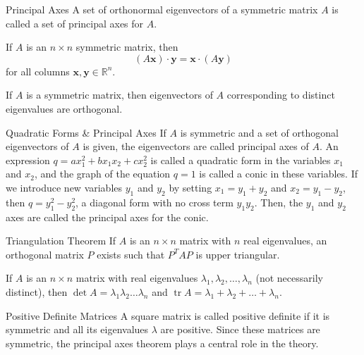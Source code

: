 \documentclass[12pt]{article}
\begin{document}
\begin{definition}{Principal Axes}{}
    A set of orthonormal eigenvectors of a symmetric matrix $ A $ is called a set of principal axes for $ A $.
\end{definition}

\begin{theorem}{}{}
    If $ A $ is an $ n \times n $ symmetric matrix, then
    \[ \left( A \mathbf{x} \right) \cdot \mathbf{y} = \mathbf{x} \cdot \left( A \mathbf{y} \right) \]
    for all columns $ \mathbf{x}, \mathbf{y} \in \mathbb{R}^n $.
\end{theorem}

\begin{theorem}{}{}
    If $ A $ is a symmetric matrix, then eigenvectors of $ A $ corresponding to distinct eigenvalues are orthogonal.
\end{theorem}

\begin{definition}{Quadratic Forms \& Principal Axes}{}
    If $ A $ is symmetric and a set of orthogonal eigenvectors of $ A $ is given, the eigenvectors are called principal axes of $ A $. An expression $ q = a x_1^2 + b x_1 x_2 + c x_2^2 $ is called a quadratic form in the variables $ x_1 $ and $ x_2 $, and the graph of the equation $ q = 1 $ is called a conic in these variables.
    \medskip
    \newline
    If we introduce new variables $ y_1 $ and $ y_2 $ by setting $ x_1 = y_1 + y_2 $ and $ x_2 = y_1 - y_2 $, then $ q = y_1^2 - y_2^2 $, a diagonal form with no cross term $ y_1 y_2 $. Then, the $ y_1 $ and $ y_2 $ axes are called the principal axes for the conic.
\end{definition}

\begin{theorem}{Triangulation Theorem}{}
    If $ A $ is an $ n \times n $ matrix with $ n $ real eigenvalues, an orthogonal matrix $ P $ exists such that $ P^T AP $ is upper triangular.
\end{theorem}

\begin{corollary}{}{}
    If $ A $ is an $ n \times n $ matrix with real eigenvalues $ \lambda_1, \lambda_2, \dots, \lambda_n $ (not necessarily distinct), then $ \det A = \lambda_1 \lambda_2 \dots \lambda_n $ and $ \operatorname{tr} A = \lambda_1 + \lambda_2 + \dots + \lambda_n $.
\end{corollary}

\begin{definition}{Positive Definite Matrices}{}
    A square matrix is called positive definite if it is symmetric and all its eigenvalues $ \lambda $ are positive.
    \medskip
    \newline
    Since these matrices are symmetric, the principal axes theorem plays a central role in the theory.
\end{definition}
\end{document}
